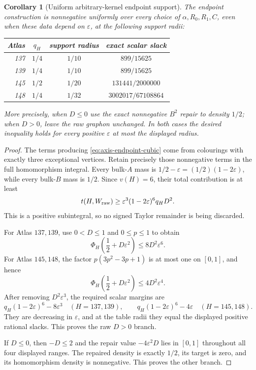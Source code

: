 \documentclass[11pt]{article}
\newtheorem{corollary}[theorem]{Corollary}
\begin{document}
\begin{corollary}[Uniform arbitrary-kernel endpoint support]
\label{cor:axis-endpoint-uniform}
The endpoint construction is nonnegative uniformly over every choice of
$\alpha,R_0,R_1,C$, even when these data depend on $\varepsilon$, at the
following support radii:
\begin{center}
\begin{tabular}{r|c|c|c}
Atlas&$q_H$&support radius&exact scalar slack\\ \hline
137&$1/4$&$1/10$&$899/15625$\\
139&$1/4$&$1/10$&$899/15625$\\
145&$1/2$&$1/20$&$131441/2000000$\\
148&$1/4$&$1/32$&$3002017/67108864$
\end{tabular}
\end{center}
More precisely, when $D\leq0$ use the exact nonnegative $B^2$ repair to
density $1/2$; when $D>0$, leave the raw graphon unchanged.  In both cases
the desired inequality holds for every positive $\varepsilon$ at most the
displayed radius.
\end{corollary}

\begin{proof}
The terms producing \eqref{eq:axis-endpoint-cubic} come from colourings with
exactly three exceptional vertices.  Retain precisely those nonnegative
terms in the full homomorphism integral.  Every bulk-$A$ mass is
$1/2-\varepsilon=(1/2)(1-2\varepsilon)$, while every bulk-$B$ mass is
$1/2$.  Since $v(H)=6$, their total contribution is at least
\begin{equation}
 t(H,W_{\rm raw})
 \geq \varepsilon^3(1-2\varepsilon)^6q_HD^2.
 \label{eq:axis-endpoint-positive-subintegral}
\end{equation}
This is a positive subintegral, so no signed Taylor remainder is being
discarded.

For Atlas $137,139$, use $0<D\leq1$ and $0\leq p\leq1$ to obtain
\[
 \Phi_H\!\left(\frac12+D\varepsilon^2\right)
 \leq8D^2\varepsilon^6.
\]
For Atlas $145,148$, the factor
$p(3p^2-3p+1)$ is at most one on $[0,1]$, and hence
\[
 \Phi_H\!\left(\frac12+D\varepsilon^2\right)
 \leq4D^2\varepsilon^4.
\]
After removing $D^2\varepsilon^3$, the required scalar margins are
\[
 q_H(1-2\varepsilon)^6-8\varepsilon^3
 \quad(H=137,139),
 \qquad
 q_H(1-2\varepsilon)^6-4\varepsilon
 \quad(H=145,148).
\]
They are decreasing in $\varepsilon$, and at the table radii they equal the
displayed positive rational slacks.  This proves the raw $D>0$ branch.

If $D\leq0$, then $-D\leq2$ and the repair value
$-4\varepsilon^2D$ lies in $[0,1]$ throughout all four displayed ranges.
The repaired density is exactly $1/2$, its target is zero, and its
homomorphism density is nonnegative.  This proves the other branch.
\end{proof}
\end{document}
